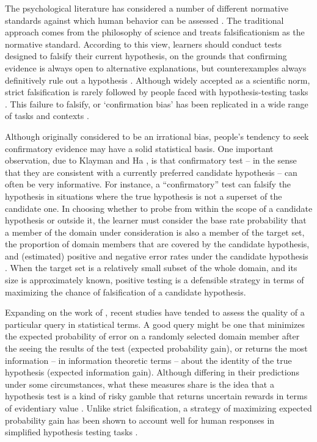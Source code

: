 \documentclass[10pt,letterpaper]{article}
\begin{document}
The psychological literature has considered a number of different normative standards against which human behavior can be assessed \cite{nelson2005usefulquestions}. The traditional approach comes from the philosophy of science and treats falsificationism as the normative standard. According to this view, learners should conduct tests designed to falsify their current hypothesis, on the grounds that confirming evidence is always open to alternative explanations, but counterexamples always definitively rule out a hypothesis \cite{popper1959scidiscovery}. Although widely accepted as a scientific norm, strict falsification is rarely followed by people faced with hypothesis-testing tasks \cite{wason1960failure,wason1968secondlook}. This failure to falsify, or `confirmation bias' has been replicated in a wide range of tasks and contexts \cite{nickerson1998confirmation}. 

Although originally considered to be an irrational bias, people's tendency to seek confirmatory evidence may have a solid statistical basis. One important observation, due to Klayman and Ha , is that confirmatory test -- in the sense that they are consistent with a currently preferred candidate hypothesis -- can often be very informative. For instance, a ``confirmatory'' test can falsify the hypothesis in situations where the true hypothesis is not a superset of the candidate one. In choosing whether to probe from within the scope of a candidate hypothesis or outside it, the learner must consider the base rate probability that a member of the domain under consideration is also a member of the target set, the proportion of domain members that are covered by the candidate hypothesis, and (estimated) positive and negative error rates under the candidate hypothesis \cite{klayman1987confirmation}. When the target set is a relatively small subset of the whole domain, and its size is approximately known, positive testing is a defensible strategy in terms of maximizing the chance of falsification of a candidate hypothesis.

Expanding on the work of , recent studies have tended to assess the quality of a particular query in statistical terms. A good query might be one that minimizes the expected probability of error on a randomly selected domain member after the seeing the results of the test (expected probability gain), or returns the most information -- in information theoretic terms -- about the identity of the true hypothesis (expected information gain). Although differing in their predictions under some circumstances, what these measures share is the idea that a hypothesis test is a kind of risky gamble that returns uncertain rewards in terms of evidentiary value \cite{poletiek2000gambles}. Unlike strict falsification, a strategy of maximizing expected probability gain has been shown to account well for human responses in simplified hypothesis testing tasks \cite{nelson2010probgain}. 
\end{document}
